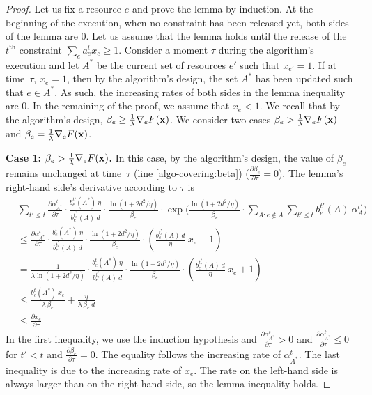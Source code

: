 \begin{proof}
	Let us fix a resource $e$ and prove the lemma by induction. At the beginning of the execution, when no constraint has been released yet, both sides of the lemma are 0.
	Let us assume that the lemma holds until the release of the $t^{\text{th}}$ constraint $\sum_{e} a^{t}_{e} x_{e} \geq 1$.
	Consider a moment $\tau$ during the algorithm's execution
	and let $A^{*}$ be the current set of resources $e'$ such that $x_{e'} = 1$.
	If at time~$\tau$, $x_{e} = 1$, then by the algorithm's design, the set $A^{*}$ has been updated such that
	$e \in A^{*}$. As such, the increasing rates of both sides in the lemma inequality are 0.
	In the remaining of the proof, we assume that  $x_{e} < 1$.
	We recall that by the algorithm's design, $\beta_{e} \geq \frac{1}{\lambda} \nabla_{e} F(\mathbf{x})$.
	We consider two cases $\beta_{e} > \frac{1}{\lambda} \nabla_{e} F(\mathbf{x})$
	and $\beta_{e} = \frac{1}{\lambda} \nabla_{e} F(\mathbf{x})$.

	\textbf{Case 1: $\beta_{e} > \frac{1}{\lambda} \nabla_{e} F(\mathbf{x})$.}
	In this case, by the algorithm's design, the value of $\beta_{e}$ remains unchanged at time~$\tau$ (line \ref{algo-covering:beta}) ($\frac{\partial \beta_{e}}{\partial \tau} = 0$).
	The lemma's right-hand side's derivative according to $\tau$ is
	\begin{align*}
	&\sum_{t' \le t} \frac{\partial \alpha^{t'}_{A^{*}}}{\partial \tau} \cdot
		\frac{b^{t'}_{e}(A^{*}) \ \eta }{b^{t_{e}^{*}}_{e}(A) \ d} \cdot \frac{\ln(1+2d^{2}/\eta)}{\beta_{e}}
			\cdot \exp\biggl( \frac{\ln(1+2d^{2}/\eta)}{\beta_{e} } \cdot \sum_{A: e \notin A} \sum_{t' \le t} b^{t'}_{e}(A)\ \alpha^{t'}_{A} \biggr) \\
	&\leq \frac{\partial \alpha^{t}_{A^{*}}}{\partial \tau} \cdot
		\frac{b^{t}_{e}(A^{*}) \ \eta }{b^{t_{e}^{*}}_{e}(A) \ d} \cdot \frac{\ln(1+2d^{2}/\eta)}{\beta_{e}} \cdot \left( \frac{b^{t_{e}^{*}}_{e}(A) \ d}{\eta}\ x_{e} + 1 \right) \\
	&= \frac{1}{\lambda \ln(1+2d^{2}/\eta)} \cdot
		\frac{b^{t}_{e}(A^{*}) \ \eta }{b^{t_{e}^{*}}_{e}(A) \ d} \cdot \frac{\ln(1+2d^{2}/\eta)}{\beta_{e}} \cdot \left( \frac{b^{t_{e}^{*}}_{e}(A) \ d}{\eta}\ x_{e} + 1 \right) \\
	&\leq  \frac{b^{t}_{e}(A^{*}) \ x_{e}}{\lambda\ \beta_{e}} + \frac{\eta}{\lambda\ \beta_{e}\ d} \\
	&\leq \frac{\partial x_{e}}{\partial \tau}
	\end{align*}
	In the first inequality, we use the induction hypothesis and $\frac{\partial \alpha^{t}_{A^{*}}}{\partial \tau} > 0$
	and $\frac{\partial \alpha^{t'}_{A^{*}}}{\partial \tau} \leq 0$ for $t' < t$ and $\frac{\partial \beta_{e}}{\partial \tau} = 0$.
	The equality follows the increasing rate of $\alpha^{t}_{A^{*}}$.
	The last inequality is due to the increasing rate of $x_{e}$.
	The rate on the left-hand side is always larger than on the right-hand side, so the lemma inequality holds.


\end{proof}
